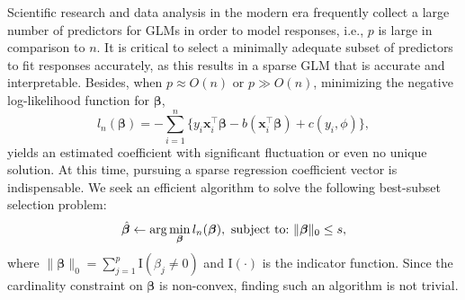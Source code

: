 Scientific research and data analysis in the modern era frequently collect a large number of predictors for GLMs in order to model responses,
i.e., $p$ is large in comparison to $n$.
It is critical to select a minimally adequate subset of predictors to fit responses accurately,
as this results in a sparse GLM that is accurate and interpretable.
Besides, when $p \approx O(n)$ or $p \gg O(n)$,
minimizing the negative log-likelihood function for $\boldsymbol \beta$,
$$l_n(\boldsymbol \beta)= - \sum_{i=1}^n\{y_i\boldsymbol {x}_i^\top \boldsymbol \beta - b(\boldsymbol {x}_i^\top\boldsymbol \beta) + c(y_i,\phi)\},$$
yields an estimated coefficient with significant fluctuation or even no unique solution.
At this time, pursuing a sparse regression coefficient vector is indispensable.
We seek an efficient algorithm to solve the following best-subset selection problem:
\begin{equation}\label{eq:best-subset-glm}
\hat{\boldsymbol \beta} \leftarrow \arg\min\limits_{\boldsymbol \beta} l_n(\boldsymbol \beta), ~\textup{subject to:}~ \|\boldsymbol \beta\|_0 \leq s,
\end{equation}
where $\|\boldsymbol\beta\|_0 = \sum\limits_{j=1}^p \mathrm{I} (\beta_j \neq 0)$ and $\mathrm{I}(\cdot)$ is the indicator function. Since the cardinality constraint on $\boldsymbol \beta$ is non-convex,
finding such an algorithm is not trivial.

